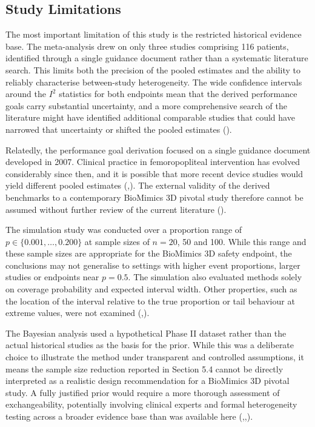 \documentclass{article}
\begin{document}
\subsection{Study Limitations}\label{study-limitations}

The most important limitation of this study is the restricted historical
evidence base. The meta-analysis drew on only three studies comprising
116 patients, identified through a single guidance document rather than
a systematic literature search. This limits both the precision of the
pooled estimates and the ability to reliably characterise between-study
heterogeneity. The wide confidence intervals around the \(I^2\)
statistics for both endpoints mean that the derived performance goals
carry substantial uncertainty, and a more comprehensive search of the
literature might have identified additional comparable studies that
could have narrowed that uncertainty or shifted the pooled estimates
().

Relatedly, the performance goal derivation focused on a single guidance
document developed in 2007. Clinical practice in femoropopliteal
intervention has evolved considerably since then, and it is possible
that more recent device studies would yield different pooled estimates
(,).
The external validity of the derived benchmarks to a contemporary
BioMimics 3D pivotal study therefore cannot be assumed without further
review of the current literature
().

The simulation study was conducted over a proportion range of
\(p \in \{0.001, \ldots, 0.200\}\) at sample sizes of \(n = 20\), 50 and
100. While this range and these sample sizes are appropriate for the
BioMimics 3D safety endpoint, the conclusions may not generalise to
settings with higher event proportions, larger studies or endpoints near
\(p = 0.5\). The simulation also evaluated methods solely on coverage
probability and expected interval width. Other properties, such as the
location of the interval relative to the true proportion or tail
behaviour at extreme values, were not examined
(,).

The Bayesian analysis used a hypothetical Phase II dataset rather than
the actual historical studies as the basis for the prior. While this was
a deliberate choice to illustrate the method under transparent and
controlled assumptions, it means the sample size reduction reported in
Section 5.4 cannot be directly interpreted as a realistic design
recommendation for a BioMimics 3D pivotal study. A fully justified prior
would require a more thorough assessment of exchangeability, potentially
involving clinical experts and formal heterogeneity testing across a
broader evidence base than was available here
(,,).
\end{document}
